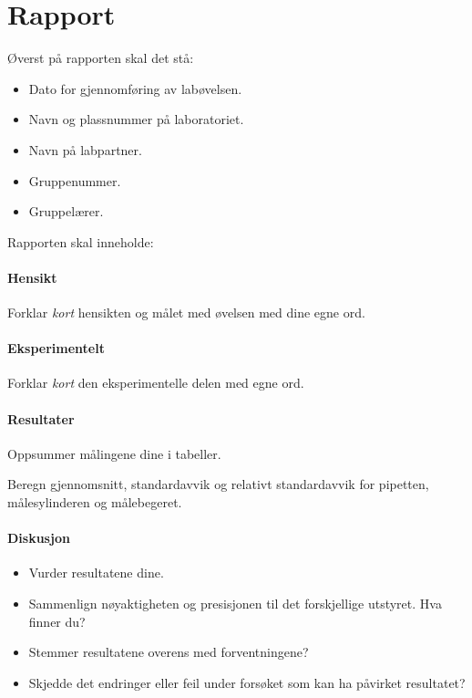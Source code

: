 
\section{Rapport}
Øverst på rapporten skal det stå:
\begin{itemize}
	\item Dato for gjennomføring av labøvelsen.
	\item Navn og plassnummer på laboratoriet.
	\item Navn på labpartner.
	\item Gruppenummer.
	\item Gruppelærer.
\end{itemize}

Rapporten skal inneholde:
\paragraph{Hensikt}
Forklar \emph{kort} hensikten og målet med øvelsen med dine egne ord.

\paragraph{Eksperimentelt}
Forklar \emph{kort} den eksperimentelle delen med egne ord.

\paragraph{Resultater}
Oppsummer målingene dine i tabeller.

Beregn gjennomsnitt, standardavvik og relativt standardavvik for pipetten, målesylinderen og målebegeret.

\paragraph{Diskusjon}
\begin{itemize}
	\item Vurder resultatene dine. 
	
	\item Sammenlign nøyaktigheten og presisjonen til det forskjellige utstyret. Hva finner du? 
	
	\item Stemmer resultatene overens med forventningene?
	
	\item Skjedde det endringer eller feil under forsøket som kan ha påvirket resultatet?
\end{itemize}
